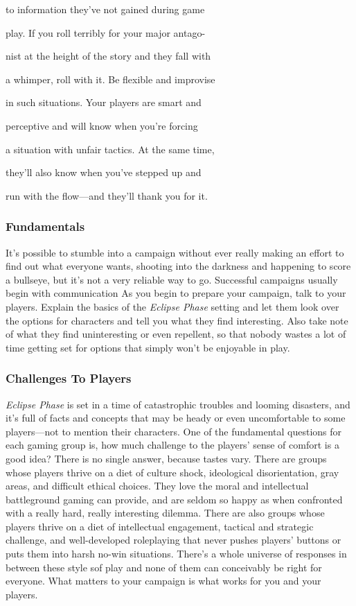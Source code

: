 to information they've not gained during game 

play. If you roll terribly for your major antago-

nist at the height of the story and they fall with 

a whimper, roll with it. Be flexible and improvise 

in such situations. Your players are smart and 

perceptive and will know when you're forcing 

a situation with unfair tactics. At the same time, 

they'll also know when you've stepped up and 

run with the flow—and they'll thank you for it.

\subsubsection{Fundamentals}

It's possible to stumble into a campaign without ever 
really making an effort to find out what everyone 
wants, shooting into the darkness and happening to 
score a bullseye, but it's not a very reliable way to go. 
Successful campaigns usually begin with communication
As you begin to prepare your campaign, talk to
your players. Explain the basics of the \textit{Eclipse Phase}
setting and let them look over the options for characters
and tell you what they find interesting. Also take
note of what they find uninteresting or even repellent, 
so that nobody wastes a lot of time getting set for options
that simply won't be enjoyable in play.

\subsubsection{Challenges To Players }

\textit{Eclipse Phase} is set in a time of catastrophic troubles 
and looming disasters, and it's full of facts and concepts
that may be heady or even uncomfortable to
some players—not to mention their characters. One of 
the fundamental questions for each gaming group is, 
how much challenge to the players' sense of comfort is 
a good idea? There is no single answer, because tastes 
vary. There are groups whose players thrive on a diet 
of culture shock, ideological disorientation, gray areas, 
and difficult ethical choices. They love the moral and 
intellectual battleground gaming can provide, and 
are seldom so happy as when confronted with a 
really hard, really interesting dilemma. There are also 
groups whose players thrive on a diet of intellectual 
engagement, tactical and strategic challenge, and well-developed
roleplaying that never pushes players'
buttons or puts them into harsh no-win situations. 
There's a whole universe of responses in between these 
style sof play and none of them can conceivably be 
right for everyone. What matters to your campaign is 
what works for you and your players. 

